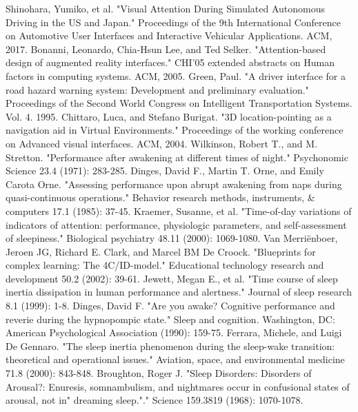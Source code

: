 \documentclass[a4paper, 11pt]{article}
\begin{document}
\begin{thebibliography}{9}
 Shinohara, Yumiko, et al. "Visual Attention During Simulated Autonomous Driving in the US and Japan." Proceedings of the 9th International Conference on Automotive User Interfaces and Interactive Vehicular Applications. ACM, 2017.
 Bonanni, Leonardo, Chia-Hsun Lee, and Ted Selker. "Attention-based design of augmented reality interfaces." CHI'05 extended abstracts on Human factors in computing systems. ACM, 2005.
 Green, Paul. "A driver interface for a road hazard warning system: Development and preliminary evaluation." Proceedings of the Second World Congress on Intelligent Transportation Systems. Vol. 4. 1995.
 Chittaro, Luca, and Stefano Burigat. "3D location-pointing as a navigation aid in Virtual Environments." Proceedings of the working conference on Advanced visual interfaces. ACM, 2004.
 Wilkinson, Robert T., and M. Stretton. "Performance after awakening at different times of night." Psychonomic Science 23.4 (1971): 283-285.
 Dinges, David F., Martin T. Orne, and Emily Carota Orne. "Assessing performance upon abrupt awakening from naps during quasi-continuous operations." Behavior research methods, instruments, \& computers 17.1 (1985): 37-45.
 Kraemer, Susanne, et al. "Time-of-day variations of indicators of attention: performance, physiologic parameters, and self-assessment of sleepiness." Biological psychiatry 48.11 (2000): 1069-1080.
 Van Merriënboer, Jeroen JG, Richard E. Clark, and Marcel BM De Croock. "Blueprints for complex learning: The 4C/ID-model." Educational technology research and development 50.2 (2002): 39-61.
 Jewett, Megan E., et al. "Time course of sleep inertia dissipation in human performance and alertness." Journal of sleep research 8.1 (1999): 1-8.
 Dinges, David F. "Are you awake? Cognitive performance and reverie during the hypnopompic state." Sleep and cognition. Washington, DC: American Psychological Association (1990): 159-75.
 Ferrara, Michele, and Luigi De Gennaro. "The sleep inertia phenomenon during the sleep-wake transition: theoretical and operational issues." Aviation, space, and environmental medicine 71.8 (2000): 843-848.
 Broughton, Roger J. "Sleep Disorders: Disorders of Arousal?: Enuresis, somnambulism, and nightmares occur in confusional states of arousal, not in" dreaming sleep."." Science 159.3819 (1968): 1070-1078.

\end{thebibliography}
\end{document}
